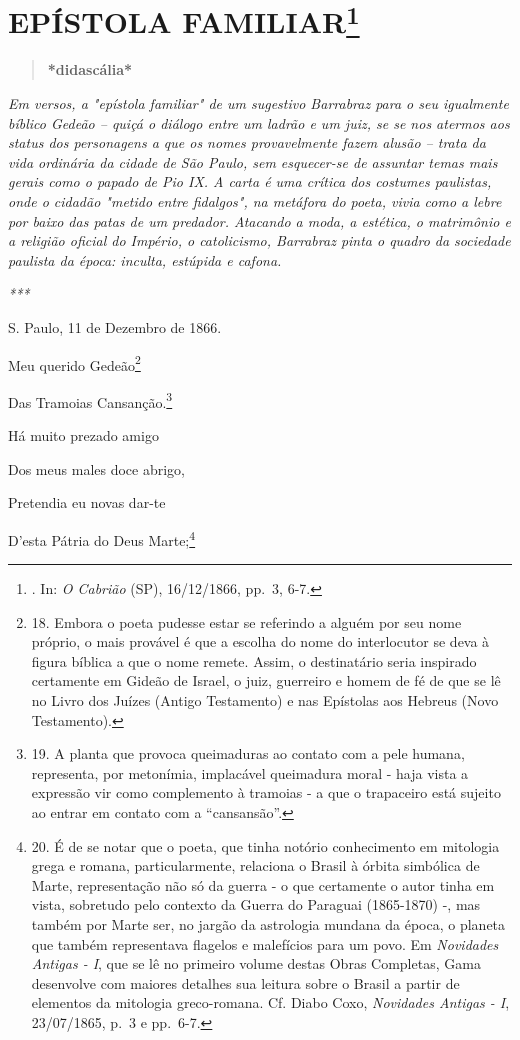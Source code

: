 \chapter[\textbf{EPÍSTOLA FAMILIAR}]{\texorpdfstring{\textbf{EPÍSTOLA
FAMILIAR}\footnote{. In: \emph{O Cabrião} (SP), 16/12/1866, pp.~3, 6-7.}}{EPÍSTOLA FAMILIAR}}

\begin{quote}
\textbf{*didascália*}
\end{quote}

\emph{Em versos, a "epístola familiar" de um sugestivo Barrabraz para o
seu igualmente bíblico Gedeão -- quiçá o diálogo entre um ladrão e um
juiz, se se nos atermos aos status dos personagens a que os nomes
provavelmente fazem alusão -- trata da vida ordinária da cidade de São
Paulo, sem esquecer-se de assuntar temas mais gerais como o papado de
Pio IX. A carta é uma crítica dos costumes paulistas, onde o cidadão
"metido entre fidalgos", na metáfora do poeta, vivia como a lebre por
baixo das patas de um predador. Atacando a moda, a estética, o
matrimônio e a religião oficial do Império, o catolicismo, Barrabraz
pinta o quadro da sociedade paulista da época: inculta, estúpida e
cafona.}

\emph{***}

S. Paulo, 11 de Dezembro de 1866.

Meu querido Gedeão\footnote{18. Embora o poeta pudesse estar se
  referindo a alguém por seu nome próprio, o mais provável é que a
  escolha do nome do interlocutor se deva à figura bíblica a que o nome
  remete. Assim, o destinatário seria inspirado certamente em Gideão de
  Israel, o juiz, guerreiro e homem de fé de que se lê no Livro dos
  Juízes (Antigo Testamento) e nas Epístolas aos Hebreus (Novo
  Testamento).}

Das Tramoias Cansanção.\footnote{19. A planta que provoca queimaduras ao
  contato com a pele humana, representa, por metonímia, implacável
  queimadura moral - haja vista a expressão vir como complemento à
  tramoias - a que o trapaceiro está sujeito ao entrar em contato com a
  ``cansansão''.}

Há muito prezado amigo

Dos meus males doce abrigo,

Pretendia eu novas dar-te

D'esta Pátria do Deus Marte;\footnote{20. É de se notar que o poeta, que
  tinha notório conhecimento em mitologia grega e romana,
  particularmente, relaciona o Brasil à órbita simbólica de Marte,
  representação não só da guerra - o que certamente o autor tinha em
  vista, sobretudo pelo contexto da Guerra do Paraguai (1865-1870) -,
  mas também por Marte ser, no jargão da astrologia mundana da época, o
  planeta que também representava flagelos e malefícios para um povo. Em
  \emph{Novidades Antigas - I}, que se lê no primeiro volume destas
  Obras Completas, Gama desenvolve com maiores detalhes sua leitura
  sobre o Brasil a partir de elementos da mitologia greco-romana. Cf.
  Diabo Coxo, \emph{Novidades Antigas - I}, 23/07/1865, p.~3 e pp.~6-7.}

